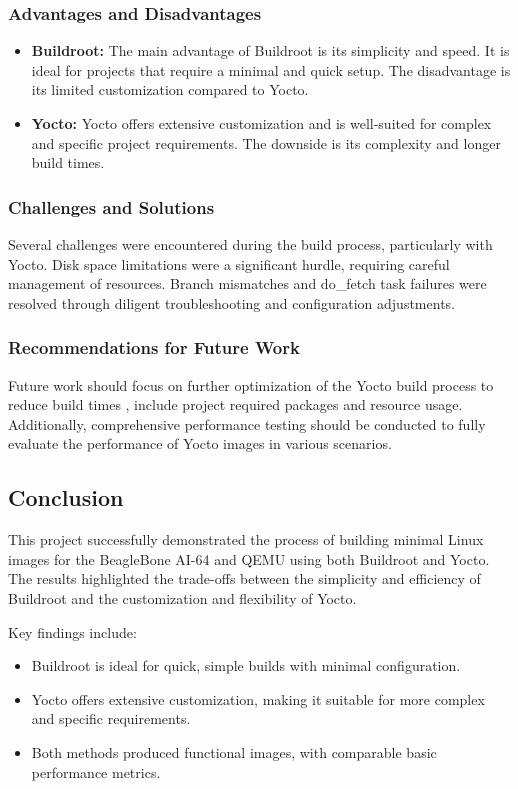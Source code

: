 \subsubsection{Advantages and Disadvantages}
\begin{itemize}
    \item \textbf{Buildroot:} The main advantage of Buildroot is its simplicity and speed. It is ideal for projects that require a minimal and quick setup. The disadvantage is its limited customization compared to Yocto.
    \item \textbf{Yocto:} Yocto offers extensive customization and is well-suited for complex and specific project requirements. The downside is its complexity and longer build times.
\end{itemize}

\subsubsection{Challenges and Solutions}
Several challenges were encountered during the build process, particularly with Yocto. Disk space limitations were a significant hurdle, requiring careful management of resources. Branch mismatches and do\_fetch task failures were resolved through diligent troubleshooting and configuration adjustments.

\subsubsection{Recommendations for Future Work}
Future work should focus on further optimization of the Yocto build process to reduce build times , include project required packages and resource usage. Additionally, comprehensive performance testing should be conducted to fully evaluate the performance of Yocto images in various scenarios.

\subsection{Conclusion}

This project successfully demonstrated the process of building minimal Linux images for the BeagleBone AI-64 and QEMU using both Buildroot and Yocto. The results highlighted the trade-offs between the simplicity and efficiency of Buildroot and the customization and flexibility of Yocto.

Key findings include:
\begin{itemize}
    \item Buildroot is ideal for quick, simple builds with minimal configuration.
    \item Yocto offers extensive customization, making it suitable for more complex and specific requirements.
    \item Both methods produced functional images, with comparable basic performance metrics.
\end{itemize}

